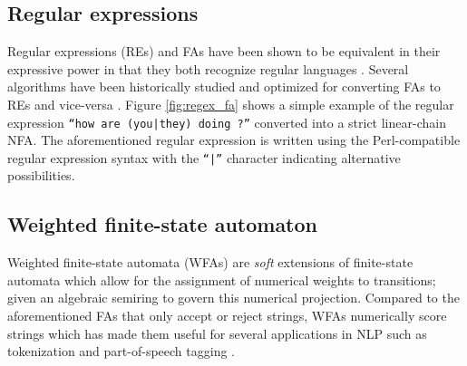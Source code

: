 \subsection{Regular expressions}

Regular expressions (REs) and FAs have been shown to be equivalent in their
expressive power in that they both recognize regular languages
\citep{sipser1996introduction}. Several algorithms have been historically
studied and optimized for converting FAs to REs and vice-versa
\citep{mcnaughton1960regular,thompson1968programming}. Figure
\ref{fig:regex_fa} shows a simple example of the regular expression
\texttt{``how are (you|they) doing ?''} converted into a strict linear-chain
NFA. The aforementioned regular expression is written using the Perl-compatible
regular expression syntax with the \texttt{``|''} character indicating alternative possibilities.

\subsection{Weighted finite-state automaton}

Weighted finite-state automata (WFAs) are \textit{soft} extensions of
finite-state automata which allow for the assignment of numerical weights to
transitions; given an algebraic semiring to govern this numerical projection.
Compared to the aforementioned FAs that only accept or reject strings, WFAs
numerically score strings which has made them useful for several applications in
NLP such as tokenization and part-of-speech tagging \citep{maletti2017survey}.

